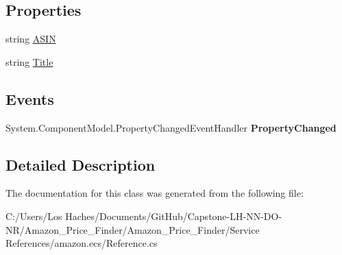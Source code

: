 \subsection*{Properties}
\begin{DoxyCompactItemize}
\item 
\hypertarget{class_amazon___price___finder_1_1amazon_1_1ecs_1_1_similar_products_similar_product_a8e5ca157e44ca45979439273bb272f41}{string \hyperlink{class_amazon___price___finder_1_1amazon_1_1ecs_1_1_similar_products_similar_product_a8e5ca157e44ca45979439273bb272f41}{A\-S\-I\-N}}\label{class_amazon___price___finder_1_1amazon_1_1ecs_1_1_similar_products_similar_product_a8e5ca157e44ca45979439273bb272f41}

\begin{DoxyCompactList}\small\item\em \end{DoxyCompactList}\item 
\hypertarget{class_amazon___price___finder_1_1amazon_1_1ecs_1_1_similar_products_similar_product_ab62a2942cc16f3920ab66d83689b5ce6}{string \hyperlink{class_amazon___price___finder_1_1amazon_1_1ecs_1_1_similar_products_similar_product_ab62a2942cc16f3920ab66d83689b5ce6}{Title}}\label{class_amazon___price___finder_1_1amazon_1_1ecs_1_1_similar_products_similar_product_ab62a2942cc16f3920ab66d83689b5ce6}

\begin{DoxyCompactList}\small\item\em \end{DoxyCompactList}\end{DoxyCompactItemize}
\subsection*{Events}
\begin{DoxyCompactItemize}
\item 
\hypertarget{class_amazon___price___finder_1_1amazon_1_1ecs_1_1_similar_products_similar_product_ad20437ce4bc2e1477404d7323603e30d}{System.\-Component\-Model.\-Property\-Changed\-Event\-Handler {\bfseries Property\-Changed}}\label{class_amazon___price___finder_1_1amazon_1_1ecs_1_1_similar_products_similar_product_ad20437ce4bc2e1477404d7323603e30d}

\end{DoxyCompactItemize}


\subsection{Detailed Description}


The documentation for this class was generated from the following file\-:\begin{DoxyCompactItemize}
\item 
C\-:/\-Users/\-Los Haches/\-Documents/\-Git\-Hub/\-Capstone-\/\-L\-H-\/\-N\-N-\/\-D\-O-\/\-N\-R/\-Amazon\-\_\-\-Price\-\_\-\-Finder/\-Amazon\-\_\-\-Price\-\_\-\-Finder/\-Service References/amazon.\-ecs/Reference.\-cs\end{DoxyCompactItemize}
